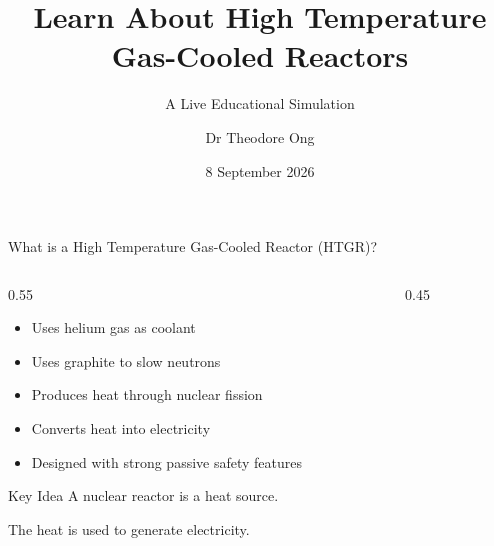 \documentclass[aspectratio=169]{beamer}
\institute{Singapore Nuclear Research and Safety Initiative}
\title[HTGR Simulator]{Learn About High Temperature Gas-Cooled Reactors}
\subtitle{A Live Educational Simulation}
\author{Dr Theodore Ong}
\date{8 September 2026}
\begin{document}
\begin{frame}
\titlepage
\end{frame}

\begin{frame}{What is a High Temperature Gas-Cooled Reactor (HTGR)?}

\begin{columns}

\begin{column}{0.55\textwidth}

\begin{itemize}
\item Uses helium gas as coolant
\item Uses graphite to slow neutrons
\item Produces heat through nuclear fission
\item Converts heat into electricity
\item Designed with strong passive safety features
\end{itemize}

\vspace{0.5cm}

\begin{block}{Key Idea}
A nuclear reactor is a heat source.

The heat is used to generate electricity.
\end{block}

\end{column}

\begin{column}{0.45\textwidth}

\centering


\end{column}

\end{columns}

\end{frame}
\end{document}
